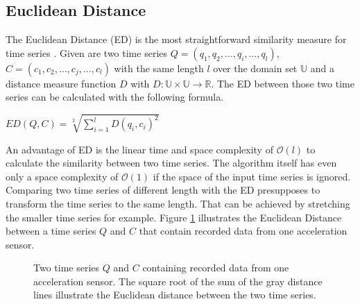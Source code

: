 \subsection{Euclidean Distance} \label{euclidean_distance}
The Euclidean Distance (ED) is the most straightforward similarity measure for time series \cite{ding2008querying}.
Given are two time series $Q = (q_1, q_2, \dots, q_i, \dots, q_l)$, $C = (c_1, c_2, \dots, c_j, \dots, c_l)$ with the
same length $l$ over the domain set $\mathbb{U}$ and a distance measure function $D$ with
$D: \mathbb{U} \times \mathbb{U} \to \mathbb{R}$. The ED between those two time series can be calculated with the
following formula.

\begin{center}
    $ED(Q, C) = \sqrt[2]{\sum \limits_{i=1}^{l} D(q_i, c_i)^2}$
\end{center}

An advantage of ED is the linear time and space complexity of $\mathcal{O}(l)$ to calculate the similarity between two
time series. The algorithm itself has even only a space complexity of $\mathcal{O}(1)$ if the space of the input time
series is ignored. Comparing two time series of different length with the ED presupposes to transform the time series
to the same length. That can be achieved by stretching the smaller time series for example. Figure
\ref{fig:euclideandistance} illustrates the Euclidean Distance between a time series $Q$ and $C$ that contain recorded
data from one acceleration sensor.

\begin{figure}
    \begin{center}
    \end{center}
    \caption{Two time series $Q$ and $C$ containing recorded data from one acceleration sensor. The square root of the
    sum of the gray distance lines illustrate the Euclidean distance between the two time series.}
    \label{fig:euclideandistance}
\end{figure}
